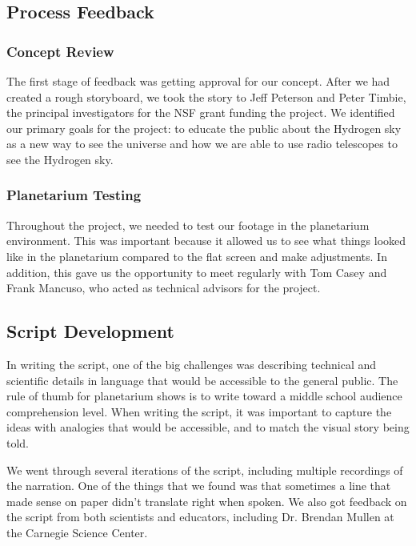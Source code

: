 \subsection{Process Feedback}

\subsubsection{Concept Review}

The first stage of feedback was getting approval for our concept. After we had created a rough storyboard, we took the story to Jeff Peterson and Peter Timbie, the principal investigators for the NSF grant funding the project. We identified our primary goals for the project: to educate the public about the Hydrogen sky as a new way to see the universe and how we are able to use radio telescopes to see the Hydrogen sky. 

\subsubsection{Planetarium Testing}

Throughout the project, we needed to test our footage in the planetarium environment. This was important because it allowed us to see what things looked like in the planetarium compared to the flat screen and make adjustments. In addition, this gave us the opportunity to meet regularly with Tom Casey and Frank Mancuso, who acted as technical advisors for the project. 


\subsection{Script Development}

In writing the script, one of the big challenges was describing technical and scientific details in language that would be accessible to the general public. The rule of thumb for planetarium shows is to write toward a middle school audience comprehension level. When writing the script, it was important to capture the ideas with analogies that would be accessible, and to match the visual story being told. 

We went through several iterations of the script, including multiple recordings of the narration. One of the things that we found was that sometimes a line that made sense on paper didn't translate right when spoken. We also got feedback on the script from both scientists and educators, including Dr. Brendan Mullen at the Carnegie Science Center. 

